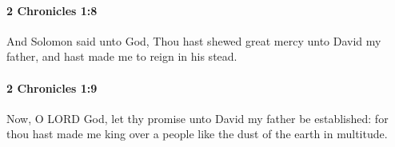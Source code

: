 		\paragraph{2 Chronicles 1:8} %
			\label{2CHRONICLES-1-8}

			And Solomon said unto God, Thou hast shewed great mercy unto David my father, and hast made me to reign in his stead.


		\paragraph{2 Chronicles 1:9} %
			\label{2CHRONICLES-1-9}

			Now, O LORD God, let thy promise unto David my father be established: for thou hast made me king over a people like the dust of the earth in multitude.



